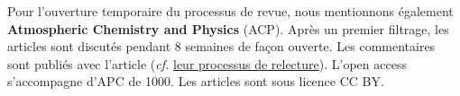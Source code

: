 Pour l'ouverture temporaire du processus de revue, nous mentionnons également \textbf{Atmospheric Chemistry and Physics} (ACP).
Après un premier filtrage, les articles sont discutés pendant 8 semaines de façon ouverte.
Les commentaires sont publiés avec l'article (\textit{cf.} \href{http://www.atmospheric-chemistry-and-physics.net/peer_review/interactive_review_process.html}{leur processus de relecture}).
L'open access s'accompagne d'APC de 1000\texteuro.
Les articles sont sous licence CC BY.
{%
%
%
%
%
%
%
%
% 
%
%
%
%
%
%

}

